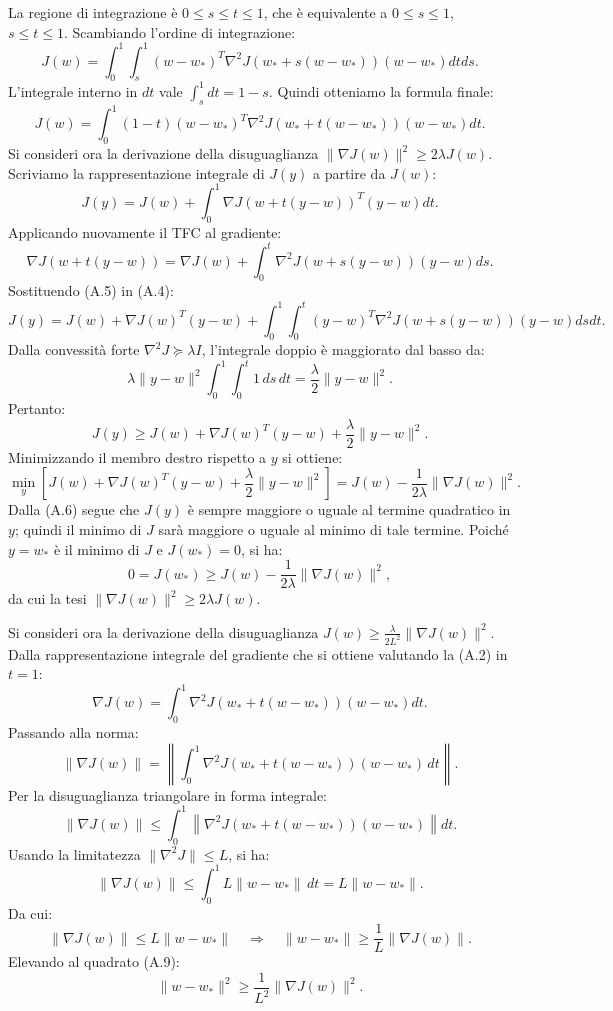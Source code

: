 \documentclass[a4paper,12pt]{article}
\begin{document}
La regione di integrazione è $0 \leq s \leq t \leq 1$, che è equivalente a $0 \leq s \leq 1$, $s \leq t \leq 1$. Scambiando l'ordine di integrazione:
\[
J(w) = \int_0^1 \int_s^1 (w - w_*)^T \nabla^2 J(w_* + s(w - w_*))(w - w_*) dt ds.
\]
L'integrale interno in $dt$ vale $\int_s^1 dt = 1 - s$. Quindi otteniamo la formula finale:
\[
J(w) = \int_0^1 (1 - t) (w - w_*)^T \nabla^2 J(w_* + t(w - w_*))(w - w_*) dt. \tag{A.3}
\]
Si consideri ora la derivazione della disuguaglianza $\|\nabla J(w)\|^2 \geq 2\lambda J(w)$. Scriviamo la rappresentazione integrale di $J(y)$ a partire da $J(w)$:
\[
J(y) = J(w) + \int_0^1 \nabla J(w + t(y - w))^T (y - w) dt. \tag{A.4}
\]
Applicando nuovamente il TFC al gradiente:
\[
\nabla J(w + t(y - w)) = \nabla J(w) + \int_0^t \nabla^2 J(w + s(y - w))(y - w) ds. \tag{A.5}
\]
Sostituendo (A.5) in (A.4):
\[
J(y) = J(w) + \nabla J(w)^T(y - w) + \int_0^1 \int_0^t (y - w)^T \nabla^2 J(w + s(y - w))(y - w) ds dt.
\]
Dalla convessità forte $\nabla^2 J \succeq \lambda I$, l'integrale doppio è maggiorato dal basso da:
\[
\lambda \|y - w\|^2 \int_0^1 \int_0^t 1 \, ds \, dt = \frac{\lambda}{2}\|y - w\|^2.
\]
Pertanto:
\[
J(y) \geq J(w) + \nabla J(w)^T(y - w) + \frac{\lambda}{2}\|y - w\|^2. \tag{A.6}
\]
Minimizzando il membro destro rispetto a $y$ si ottiene:
\[
\min_y \left[ J(w) + \nabla J(w)^T(y - w) + \frac{\lambda}{2}\|y - w\|^2 \right]
= J(w) - \frac{1}{2\lambda}\|\nabla J(w)\|^2.
\]
Dalla (A.6) segue che $J(y)$ è sempre maggiore o uguale al termine quadratico in $y$; quindi il minimo di $J$ sarà maggiore o uguale al minimo di tale termine. Poiché $y = w_*$ è il minimo di $J$ e $J(w_*) = 0$, si ha:
\[
0 = J(w_*) \geq J(w) - \frac{1}{2\lambda}\|\nabla J(w)\|^2,
\]
da cui la tesi $\|\nabla J(w)\|^2 \geq 2\lambda J(w)$.

Si consideri ora la derivazione della disuguaglianza $J(w) \geq \frac{\lambda}{2L^2} \|\nabla J(w)\|^2$. Dalla rappresentazione integrale del gradiente che si ottiene valutando la (A.2) in $t=1$:
\[
\nabla J(w) = \int_0^1 \nabla^2 J(w_* + t(w - w_*))(w - w_*) dt. \tag{A.7}
\]
Passando alla norma:
\[
\|\nabla J(w)\| 
= \left\| \int_0^1 \nabla^2 J(w_* + t(w - w_*))(w - w_*) \, dt \right\|.
\]
Per la disuguaglianza triangolare in forma integrale:
\[
\|\nabla J(w)\| 
\leq \int_0^1 \left\| \nabla^2 J(w_* + t(w - w_*))(w - w_*) \right\| dt.
\]
Usando la limitatezza $\|\nabla^2 J\| \leq L$, si ha:
\[
\|\nabla J(w)\| 
\leq \int_0^1 L \|w - w_*\| \, dt 
= L \|w - w_*\|. \tag{A.8}
\]
Da cui:
\[
\|\nabla J(w)\| \leq L \|w - w_*\| \quad \Longrightarrow \quad \|w - w_*\| \geq \frac{1}{L} \|\nabla J(w)\|. \tag{A.9}
\]
Elevando al quadrato (A.9):
\[
\|w - w_*\|^2 \geq \frac{1}{L^2} \|\nabla J(w)\|^2. \tag{A.10}
\]
\end{document}

